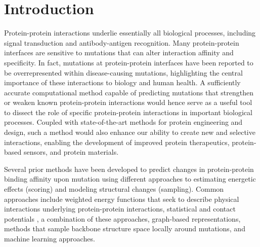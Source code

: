 \section{Introduction}

Protein-protein interactions underlie essentially all biological processes, including signal transduction and antibody-antigen recognition. Many protein-protein interfaces are sensitive to mutations that can alter interaction affinity and specificity.
In fact, mutations at protein-protein interfaces have been reported to be overrepresented within disease-causing mutations\cite{jubb_mutations_2017}, highlighting the central importance of these interactions to biology and human health.
A sufficiently accurate computational method capable of predicting mutations that strengthen or weaken known protein-protein interactions would hence serve as a useful tool to dissect the role of specific protein-protein interactions in important biological processes. Coupled with state-of-the-art methods for protein engineering and design, such a method would also enhance our ability to create new and selective interactions, enabling the development of improved protein therapeutics, protein-based sensors, and protein materials.

Several prior methods have been developed to predict changes in protein-protein binding affinity upon mutation using different approaches to estimating energetic effects (scoring) and modeling structural changes (sampling). Common approaches include
weighted energy functions that seek to describe physical interactions underlying protein-protein interactions\cite{guerois_predicting_2002,kamisetty_accounting_2011},
statistical and contact potentials \cite{dehouck_beatmusic:_2013,moal_intermolecular_2013,vangone_contacts-based_2015,brender_predicting_2015},
a combination of these approaches\cite{li_predicting_2014,tuncbag_identification_2009},
graph-based representations\cite{pires_mcsm:_2014},
methods that sample backbone structure space locally around mutations\cite{dourado_multiscale_2014},
and machine learning approaches\cite{zhu_kfc2:_2011}.

